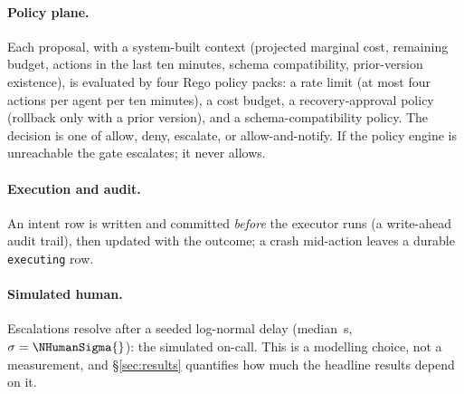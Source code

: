 \paragraph{Policy plane.}
Each proposal, with a system-built context (projected marginal cost, remaining budget, actions in
the last ten minutes, schema compatibility, prior-version existence), is evaluated by four Rego
policy packs: a rate limit (at most four actions per agent per ten minutes), a cost budget, a
recovery-approval policy (rollback only with a prior version), and a schema-compatibility policy.
The decision is one of allow, deny, escalate, or allow-and-notify. If the policy engine is
unreachable the gate escalates; it never allows.

\paragraph{Execution and audit.}
An intent row is written and committed \emph{before} the executor runs (a write-ahead audit trail),
then updated with the outcome; a crash mid-action leaves a durable \texttt{executing} row.

\paragraph{Simulated human.}
Escalations resolve after a seeded log-normal delay (median \NHumanMedian{}\,s, $\sigma=\NHumanSigma{}$):
the simulated on-call. This is a modelling choice, not a measurement, and \S\ref{sec:results}
quantifies how much the headline results depend on it.
